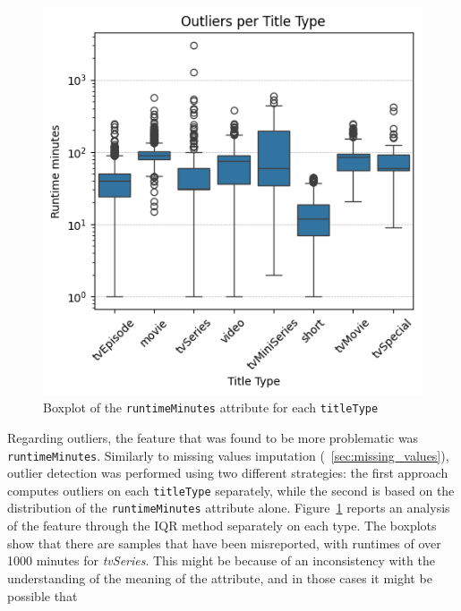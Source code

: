 \begin{figure}
    \centering
    \includegraphics[width=1\linewidth]{plots/outliers.png}
    \captionsetup{width=0.9\linewidth, justification=raggedleft}
    \caption{Boxplot of the \texttt{runtimeMinutes} attribute for each \texttt{titleType}}
    \label{fig:outliers}
\end{figure}
Regarding outliers, the feature that was found to be more problematic was \texttt{runtimeMinutes}.
Similarly to missing values imputation (~\ref{sec:missing_values}),
outlier detection was performed using two different strategies:
the first approach computes outliers on each \texttt{titleType} separately,
while the second is based on the distribution of the \texttt{runtimeMinutes} attribute alone.
Figure~\ref{fig:outliers} reports an analysis of the feature through the IQR method separately on each type.
The boxplots show that there are samples that have been misreported, with runtimes of over 1000 minutes for \textit{tvSeries}.
This might be because of an inconsistency with the understanding of the meaning of the attribute, and in those cases it might be possible that
